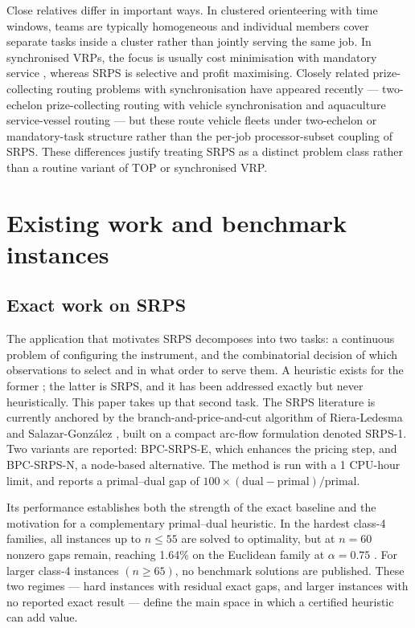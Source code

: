 \documentclass[preprint,12pt]{elsarticle}
\begin{document}
Close relatives differ in important ways. In clustered orienteering with time windows, teams are typically homogeneous and individual members cover separate tasks inside a cluster rather than jointly serving the same job. In synchronised VRPs, the focus is usually cost minimisation with mandatory service \cite{Drexl2012SurveySync,Afifi2016COPTW}, whereas SRPS is selective and profit maximising. Closely related prize-collecting routing problems with synchronisation have appeared recently --- two-echelon prize-collecting routing with vehicle synchronisation \cite{TwoEchelonPCVRPSync} and aquaculture service-vessel routing \cite{AquacultureServiceVRP} --- but these route vehicle fleets under two-echelon or mandatory-task structure rather than the per-job processor-subset coupling of SRPS. These differences justify treating SRPS as a distinct problem class rather than a routine variant of TOP or synchronised VRP.

\section{Existing work and benchmark instances}\label{sec:related}

\subsection{Exact work on SRPS}

The application that motivates SRPS decomposes into two tasks: a continuous problem of configuring the instrument, and the combinatorial decision of which observations to select and in what order to serve them. A heuristic exists for the former \cite{SalazarGonzalez2021Masks}; the latter is SRPS, and it has been addressed exactly but never heuristically. This paper takes up that second task. The SRPS literature is currently anchored by the branch-and-price-and-cut algorithm of Riera-Ledesma and Salazar-Gonz\'alez \cite{RieraLedesma2021SRPS}, built on a compact arc-flow formulation denoted SRPS-1. Two variants are reported: BPC-SRPS-E, which enhances the pricing step, and BPC-SRPS-N, a node-based alternative. The method is run with a 1 CPU-hour limit, and reports a primal--dual gap of $100\times(\text{dual}-\text{primal})/\text{primal}$.

Its performance establishes both the strength of the exact baseline and the motivation for a complementary primal--dual heuristic. In the hardest class-4 families, all instances up to $n\le 55$ are solved to optimality, but at $n=60$ nonzero gaps remain, reaching 1.64\% on the Euclidean family at $\alpha=0.75$ \cite{RieraLedesma2021SRPS}. For larger class-4 instances $(n\ge 65)$, no benchmark solutions are published. These two regimes --- hard instances with residual exact gaps, and larger instances with no reported exact result --- define the main space in which a certified heuristic can add value.
\end{document}
